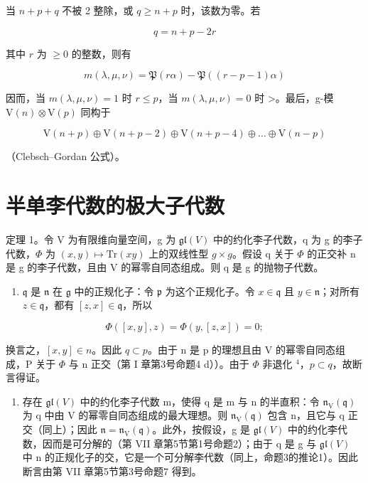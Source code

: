 当 \(n + p + q\) 不被 2 整除，或 \(q \geq n + p\) 时，该数为零。若

\[
q = n + p - 2 r
\]

其中 \(r\) 为 \(\geq 0\) 的整数，则有

\[
m (\lambda , \mu , \nu) = \mathfrak {P} (r \alpha) - \mathfrak {P} ((r - p - 1) \alpha)
\]

因而，当 \(m(\lambda,\mu,\nu)=1\) 时 \(r\leq p\)，当 \(m(\lambda,\mu,\nu)=0\) 时 \textgreater。最后，g-模 \(\mathrm{V}(n)\otimes\mathrm{V}(p)\) 同构于

\[
\mathrm{V} (n + p) \oplus \mathrm{V} (n + p - 2) \oplus \mathrm{V} (n + p - 4) \oplus \dots \oplus \mathrm{V} (n - p)
\]

（Clebsch–Gordan 公式）。

\section{半单李代数的极大子代数}

定理 1。令 V 为有限维向量空间，g 为 \(\mathfrak{gl}(V)\) 中的约化李子代数，q 为 g 的李子代数，\(\Phi\) 为 \((x,y)\mapsto\mathrm{Tr}(xy)\) 上的双线性型 \(g\times g\)。假设 q 关于 \(\Phi\) 的正交补 n 是 g 的李子代数，且由 V 的幂零自同态组成。则 q 是 g 的抛物子代数。

\begin{enumerate}
\def\labelenumi{\alph{enumi})}
\tightlist
\item
  \(\mathfrak{q}\) 是 \(\mathfrak{n}\) 在 \(\mathfrak{g}\) 中的正规化子：令 \(\mathfrak{p}\) 为这个正规化子。令 \(x \in \mathfrak{q}\) 且 \(y \in \mathfrak{n}\)；对所有 \(z \in \mathfrak{q}\)，都有 \([z, x] \in \mathfrak{q}\)，所以
\end{enumerate}

\[
\Phi ([ x, y ], z) = \Phi (y, [ z, x ]) = 0;
\]

换言之，\([x,y] \in n\)。因此 \(q \subset p\)。由于 n 是 p 的理想且由 V 的幂零自同态组成，P 关于 \(\varPhi\) 与 n 正交（第 I 章第3号命题4 d））。由于 \(\varPhi\) 非退化 \(^{4}\)，\(p \subset q\)，故断言得证。

\begin{enumerate}
\def\labelenumi{\alph{enumi})}
\setcounter{enumi}{1}
\tightlist
\item
  存在 \(\mathfrak{gl}(V)\) 中的约化李子代数 m，使得 q 是 m 与 n 的半直积：令 \(\mathfrak{n}_{\mathrm{V}}(\mathfrak{q})\) 为 q 中由 V 的幂零自同态组成的最大理想。则 \(\mathfrak{n}_{\mathrm{V}}(\mathfrak{q})\) 包含 n，且它与 q 正交（同上）；因此 \(\mathfrak{n} = \mathfrak{n}_{\mathrm{V}}(\mathfrak{q})\)。此外，按假设，g 是 \(\mathfrak{gl}(V)\) 中的约化李代数，因而是可分解的（第 VII 章第5节第1号命题2）；由于 q 是 g 与 \(\mathfrak{gl}(V)\) 中 n 的正规化子的交，它是一个可分解李代数（同上，命题3的推论1）。因此断言由第 VII 章第5节第3号命题7 得到。
\end{enumerate}

